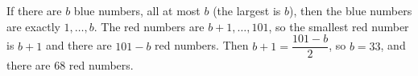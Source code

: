 If there are $b$ blue numbers, all at most $b$ (the largest is $b$), then the blue numbers are exactly $1,\dots,b$. The red numbers are $b+1,\dots,101$, so the smallest red number is $b+1$ and there are $101-b$ red numbers. Then $b+1=\dfrac{101-b}2$, so $b=33$, and there are $\boxed{68}$ red numbers.

